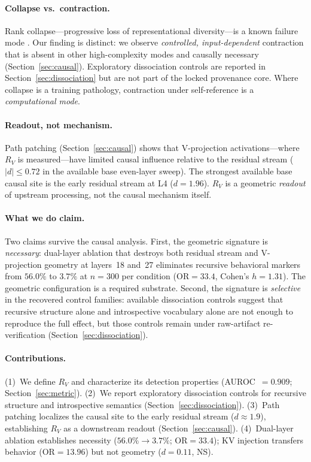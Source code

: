 \documentclass{article}
\newcommand{\RV}{R_V}
\newcommand{\dcohen}{d}
\begin{document}
\paragraph{Collapse vs.\ contraction.}
Rank collapse---progressive loss of representational diversity---is a known failure mode
\citep{noci2022signal, dong2021attention, hong2024variance, giorlandino2025two}.
Our finding is distinct: we observe \emph{controlled, input-dependent} contraction that is
absent in other high-complexity modes and causally necessary (Section~\ref{sec:causal}).
Exploratory dissociation controls are reported in Section~\ref{sec:dissociation} but are not part
of the locked provenance core.
Where collapse is a training pathology, contraction under self-reference is a
\emph{computational mode}.

\paragraph{Readout, not mechanism.}
Path patching (Section~\ref{sec:causal}) shows that V-projection activations---where
$\RV$ is measured---have limited causal influence relative to the residual stream
($|\dcohen| \leq 0.72$ in the available base even-layer sweep).
The strongest available base causal site is the early residual stream at L4
($\dcohen = 1.96$).
$\RV$ is a geometric \emph{readout} of upstream processing, not the causal mechanism itself.

\paragraph{What we do claim.}
Two claims survive the causal analysis.
First, the geometric signature is \emph{necessary}: dual-layer ablation that destroys both residual
stream and V-projection geometry at layers~18 and~27 eliminates recursive behavioral markers
from $56.0\%$ to $3.7\%$ at $n{=}300$ per condition (OR${=}33.4$, Cohen's $h = 1.31$).
The geometric configuration is a required substrate.
Second, the signature is \emph{selective} in the recovered control families: available dissociation
controls suggest that recursive structure alone and introspective vocabulary alone are not enough to
reproduce the full effect, but those controls remain under raw-artifact re-verification
(Section~\ref{sec:dissociation}).

\paragraph{Contributions.}
(1)~We define $\RV$ and characterize its detection properties (AUROC~$= 0.909$;
Section~\ref{sec:metric}).
(2)~We report exploratory dissociation controls for recursive structure and introspective semantics
(Section~\ref{sec:dissociation}).
(3)~Path patching localizes the causal site to the early residual stream ($\dcohen \approx 1.9$),
establishing $\RV$ as a downstream readout (Section~\ref{sec:causal}).
(4)~Dual-layer ablation establishes necessity ($56.0\% \to 3.7\%$; OR${=}33.4$);
KV injection transfers behavior (OR${}=13.96$) but not geometry
($\dcohen = 0.11$, NS).
\end{document}

